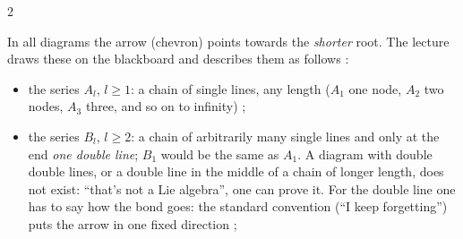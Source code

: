 \begin{paracol}{2}
\begin{center}
\end{center}
\begin{center}
\end{center}
In all diagrams the arrow (chevron) points towards the \emph{shorter} root. The lecture draws these on the blackboard and describes them as follows  :
\begin{itemize}
  \item the series \textbf{$A_l$}, $l\ge1$: a chain of single lines, any length ($A_1$ one node, $A_2$ two nodes, $A_3$ three, and so on to infinity)  ;
  \item the series \textbf{$B_l$}, $l\ge2$: a chain of arbitrarily many single lines and only at the end \emph{one double line}; $B_1$ would be the same as $A_1$. A diagram with double double lines, or a double line in the middle of a chain of longer length, does not exist: ``that's not a Lie algebra'', one can prove it. For the double line one has to say how the bond goes: the standard convention (``I keep forgetting'') puts the arrow in one fixed direction   ;

\end{itemize}
\end{paracol}
